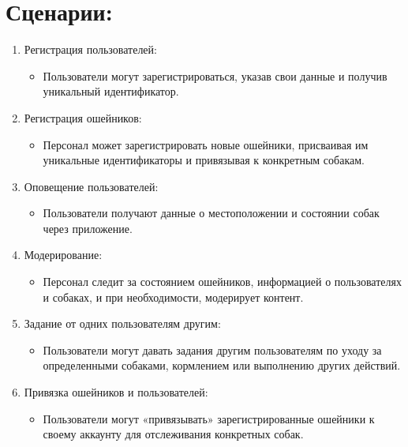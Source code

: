 \documentclass[letterpaper,10pt,russian]{sphinxmanual}
\begin{document}
\chapter{Сценарии:}
\label{\detokenize{README:id2}}\begin{enumerate}
%
\item {} 
\sphinxAtStartPar
Регистрация пользователей:
\begin{itemize}
\item {} 
\sphinxAtStartPar
Пользователи могут зарегистрироваться, указав свои данные и получив уникальный идентификатор.

\end{itemize}

\item {} 
\sphinxAtStartPar
Регистрация ошейников:
\begin{itemize}
\item {} 
\sphinxAtStartPar
Персонал может зарегистрировать новые ошейники, присваивая им уникальные идентификаторы и привязывая к конкретным собакам.

\end{itemize}

\item {} 
\sphinxAtStartPar
Оповещение пользователей:
\begin{itemize}
\item {} 
\sphinxAtStartPar
Пользователи получают данные о местоположении и состоянии собак через приложение.

\end{itemize}

\item {} 
\sphinxAtStartPar
Модерирование:
\begin{itemize}
\item {} 
\sphinxAtStartPar
Персонал следит за состоянием ошейников, информацией о пользователях и собаках, и при необходимости, модерирует контент.

\end{itemize}

\item {} 
\sphinxAtStartPar
Задание от одних пользователям другим:
\begin{itemize}
\item {} 
\sphinxAtStartPar
Пользователи могут давать задания другим пользователям по уходу за определенными собаками, кормлением или выполнению других действий.

\end{itemize}

\item {} 
\sphinxAtStartPar
Привязка ошейников и пользователей:
\begin{itemize}
\item {} 
\sphinxAtStartPar
Пользователи могут «привязывать» зарегистрированные ошейники к своему аккаунту для отслеживания конкретных собак.

\end{itemize}

\end{enumerate}
\end{document}

